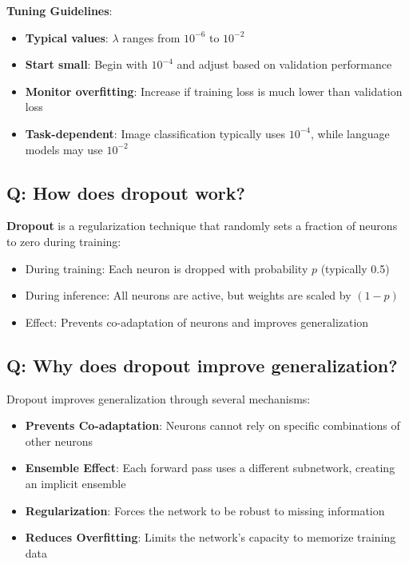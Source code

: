 \textbf{Tuning Guidelines}:
\begin{itemize}
	\item \textbf{Typical values}: $\lambda$ ranges from $10^{-6}$ to $10^{-2}$
	\item \textbf{Start small}: Begin with $10^{-4}$ and adjust based on validation performance
	\item \textbf{Monitor overfitting}: Increase if training loss is much lower than validation loss
	\item \textbf{Task-dependent}: Image classification typically uses $10^{-4}$, while language models may use $10^{-2}$
\end{itemize}

\subsection*{\textcolor{primaryteal}{Q: How does dropout work?}}
\textbf{Dropout} is a regularization technique that randomly sets a fraction of neurons to zero during training:

\begin{itemize}
	\item During training: Each neuron is dropped with probability $p$ (typically 0.5)
	\item During inference: All neurons are active, but weights are scaled by $(1-p)$
	\item Effect: Prevents co-adaptation of neurons and improves generalization
\end{itemize}

\subsection*{\textcolor{primaryteal}{Q: Why does dropout improve generalization?}}
Dropout improves generalization through several mechanisms:

\begin{itemize}
	\item \textbf{Prevents Co-adaptation}: Neurons cannot rely on specific combinations of other neurons
	\item \textbf{Ensemble Effect}: Each forward pass uses a different subnetwork, creating an implicit ensemble
	\item \textbf{Regularization}: Forces the network to be robust to missing information
	\item \textbf{Reduces Overfitting}: Limits the network's capacity to memorize training data
\end{itemize}

